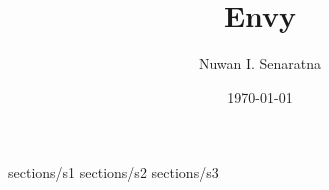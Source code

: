 \documentclass[AEJ]{AEA}
\title{Envy}
\author{Nuwan I. Senaratna}
\date{\today}
\begin{document}
\maketitle

 {sections/s1}
 {sections/s2}
 {sections/s3}


\end{document}
